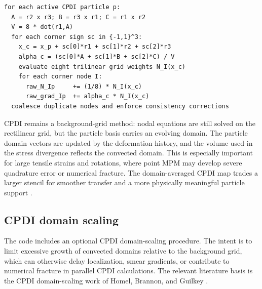 \begin{lstlisting}[caption={CPDI map construction for a parallelepiped particle domain.},basicstyle=\ttfamily\small]
for each active CPDI particle p:
  A = r2 x r3; B = r3 x r1; C = r1 x r2
  V = 8 * dot(r1,A)
  for each corner sign sc in {-1,1}^3:
    x_c = x_p + sc[0]*r1 + sc[1]*r2 + sc[2]*r3
    alpha_c = (sc[0]*A + sc[1]*B + sc[2]*C) / V
    evaluate eight trilinear grid weights N_I(x_c)
    for each corner node I:
      raw_N_Ip     += (1/8) * N_I(x_c)
      raw_grad_Ip  += alpha_c * N_I(x_c)
  coalesce duplicate nodes and enforce consistency corrections
\end{lstlisting}

CPDI remains a background-grid method: nodal equations are still solved on the rectilinear grid, but the particle basis carries an evolving domain.  The particle domain vectors are updated by the deformation history, and the volume used in the stress divergence reflects the convected domain.  This is especially important for large tensile strains and rotations, where point MPM may develop severe quadrature error or numerical fracture.  The domain-averaged CPDI map trades a larger stencil for smoother transfer and a more physically meaningful particle support \cite{sadeghirad2011cpdi,homel2016domaindef}.

\subsection{CPDI domain scaling}
\label{subsec:cpdi-domain-scaling}

The code includes an optional CPDI domain-scaling procedure.  The intent is to limit excessive growth of convected domains relative to the background grid, which can otherwise delay localization, smear gradients, or contribute to numerical fracture in parallel CPDI calculations.  The relevant literature basis is the CPDI domain-scaling work of Homel, Brannon, and Guilkey \cite{homel2016domaindef}.

